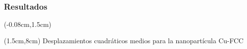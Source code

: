 \begin{frame}
 \frametitle{Resultados}
 
 \begin{textblock*}{12.6cm}(-0.08cm,1.5cm) 
      \begin{figure}[htp]
	\centering
      \end{figure}
    \end{textblock*}
    \begin{textblock*}{10cm}(1.5cm,8cm) 
    \centering
      Desplazamientos cuadr\'aticos medios para la nanopart\'icula Cu-FCC
 \end{textblock*}
\end{frame}

